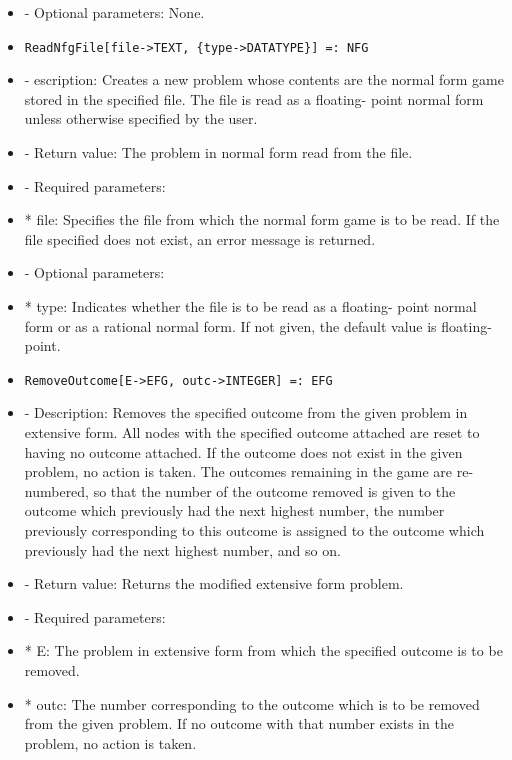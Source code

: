 \begin{itemize}
\item
- Optional parameters:  None.
\ed

\item
\begin{verbatim}
ReadNfgFile[file->TEXT, {type->DATATYPE}] =: NFG
\end{verbatim}

\bd
\item
- escription:  Creates a new problem whose contents are the normal form
game stored in the specified file.  The file is read as a floating-
point normal form unless otherwise specified by the user.
\item
- Return value:  The problem in normal form read from the file.
\item
- Required parameters:

\bd
\item
*  file:  Specifies the file from which the normal form game is to be
read.  If the file specified does not exist, an error message
is returned.
\ed

\item
- Optional parameters:
	

\bd
\item
*  type:  Indicates whether the file is to be read as a floating-
point normal form or as a rational normal form.  If not given,
the default value is floating-point.
\ed
\ed

\item

\begin{verbatim}
RemoveOutcome[E->EFG, outc->INTEGER] =: EFG
\end{verbatim}

\bd
\item
- Description:  Removes the specified outcome from the given problem in
extensive form.  All nodes with the specified outcome attached are 
reset to having no outcome attached.  If the outcome does not exist in
the given problem, no action is taken.  The outcomes remaining in the 
game are re-numbered, so that the number of the outcome removed is 
given to the outcome which previously had the next highest number, the
number previously corresponding to this outcome is assigned to the
outcome which previously had the next highest number, and so on.  
\item  
- Return value:  Returns the modified extensive form problem.
\item
- Required parameters:
	
\bd
\item
*  E:  The problem in extensive form from which the specified outcome
is to be removed.
\item
*  outc:  The number corresponding to the outcome which is to be 
removed from the given problem.  If no outcome with that number
exists in the problem, no action is taken.
\ed
\ed


\end{itemize}
